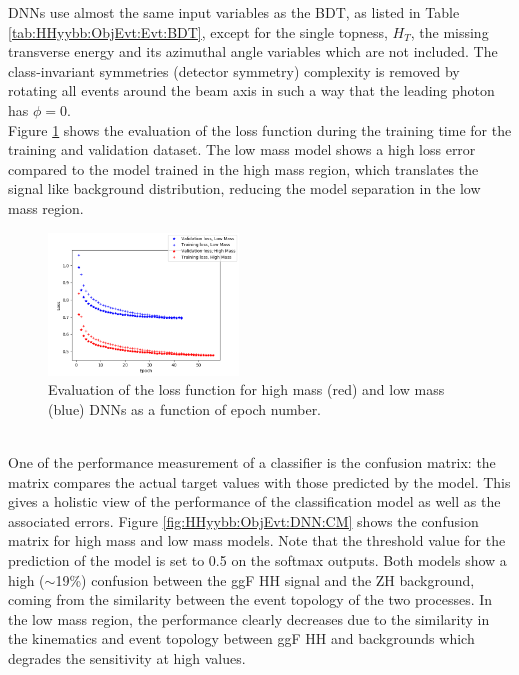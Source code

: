 DNNs use almost the same input variables as the BDT, as listed in Table \ref{tab:HHyybb:ObjEvt:Evt:BDT}, except for the single topness, $H_T$, the missing transverse energy and its azimuthal angle variables which are not included. The class-invariant symmetries (detector symmetry) complexity is removed by rotating all events around the beam axis in such a way that the leading photon has $\phi=0$. \\
Figure \ref{fig:HHyybb:ObjEvt:DNN:Loss} shows the evaluation of the loss function during the training time for the training and validation dataset.  The low mass model shows a high loss error compared to the model trained in the high mass region, which translates the signal like background distribution, reducing the model separation in the low mass region. \\
\begin{figure}[htbp]
    \centering
    \includegraphics[width=0.45\textwidth]{Ch5/Img/Loss_DNN.png}
    \begin{tcolorbox}[colback=black!5!white,colframe=white!75!black]
    \caption{Evaluation of the loss function for high mass (red) and low mass (blue) DNNs as a function of epoch number.}
    \label{fig:HHyybb:ObjEvt:DNN:Loss}
    \end{tcolorbox}
    
\end{figure}
\\
One of the performance measurement of a classifier is the confusion matrix: the matrix compares the actual target values with those predicted by the model. This gives a holistic view of the performance of the classification model as well as the associated errors. Figure \ref{fig:HHyybb:ObjEvt:DNN:CM} shows the confusion matrix for high mass and low mass models. Note that the threshold value for the prediction of the model is set to 0.5 on the softmax outputs. Both models show a high ($\sim$19\%) confusion between the ggF HH signal and the ZH background, coming from the similarity between the event topology of the two processes. In the low mass region, the performance clearly decreases due to the similarity in the kinematics and event topology between ggF HH and backgrounds which degrades the sensitivity at high \kl values.
